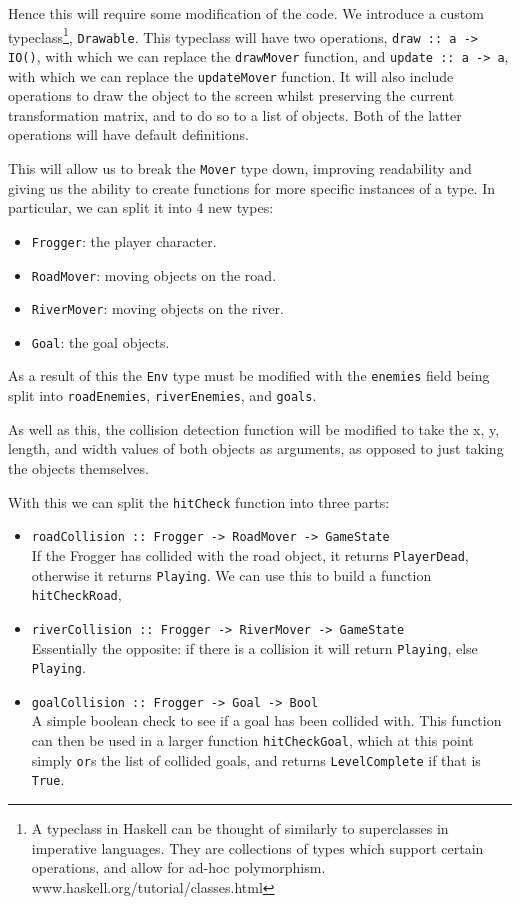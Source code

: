 \documentclass[12pt, a4paper]{report}
\begin{document}
Hence this will require some modification of the code.
We introduce a custom typeclass\footnote{A typeclass in Haskell can be thought of similarly to superclasses in imperative languages.
They are collections of types which support certain operations, and allow for ad-hoc polymorphism. www.haskell.org/tutorial/classes.html}, \verb|Drawable|.
This typeclass will have two operations, \verb|draw :: a -> IO()|, with which we can replace the \verb|drawMover| function, and \verb|update :: a -> a|, with which we can replace the \verb|updateMover| function.
It will also include operations to draw the object to the screen whilst preserving the current transformation matrix, and to do so to a list of objects.
Both of the latter operations will have default definitions.

This will allow us to break the \verb|Mover| type down, improving readability and giving us the ability to create functions for more specific instances of a type.
In particular, we can split it into 4 new types:
\begin{itemize}
  \item \verb|Frogger|: the player character.
    \item \verb|RoadMover|: moving objects on the road.
    \item \verb|RiverMover|: moving objects on the river.
    \item \verb|Goal|: the goal objects.
\end{itemize}

\par

As a result of this the \verb|Env| type must be modified with the \verb|enemies| field being split into \verb|roadEnemies|, \verb|riverEnemies|, and \verb|goals|.

As well as this, the collision detection function will be modified to take the x, y, length, and width values of both objects as arguments, as opposed to just taking the objects themselves.

\par

With this we can split the \verb|hitCheck| function into three parts:
\begin{itemize}
  \item \verb|roadCollision :: Frogger -> RoadMover -> GameState|\\
    If the Frogger has collided with the road object, it returns \verb|PlayerDead|, otherwise it returns \verb|Playing|.
    We can use this to build a function \verb|hitCheckRoad|,
  \item \verb|riverCollision :: Frogger -> RiverMover -> GameState|\\
    Essentially the opposite: if there is a collision it will return \verb|Playing|, else \verb|Playing|.
  \item \verb|goalCollision :: Frogger -> Goal -> Bool|\\
    A simple boolean check to see if a goal has been collided with.
    This function can then be used in a larger function \verb|hitCheckGoal|, which at this point simply \verb|or|s the list of collided goals, and returns \verb|LevelComplete| if that is \verb|True|.

\end{itemize}
\end{document}
